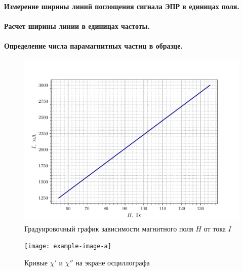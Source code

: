 \paragraph{Измерение ширины линий поглощения сигнала ЭПР в единицах поля.}%

\paragraph{Расчет ширины линии в единицах частоты.}

\paragraph{Определение числа парамагнитных частиц в образце.}%


\begin{figure}[h!]
    \centering
    \includegraphics[scale=1]{fig/fig1}
    \caption{Градуировочный график зависимости магнитного поля $H$ от тока $I$}
    \label{fig:1}
\end{figure}

\begin{figure}[h!]
    \centering
    \texttt{[image: example-image-a]}
    \caption{Кривые $\chi'$ и  $\chi''$ на экране осциллографа}
    \label{fig:2}
\end{figure}



